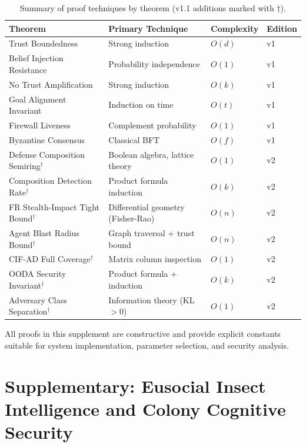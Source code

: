 \documentclass[
]{article}
\begin{document}
\begin{table}[htbp]
\centering
\caption{Summary of proof techniques by theorem (v1.1 additions marked with $\dagger$).}
\label{tab:proof-summary-v2}
\begin{tabular}{@{}llll@{}}
\toprule
Theorem & Primary Technique & Complexity & Edition \\
\midrule
Trust Boundedness & Strong induction & $O(d)$ & v1 \\
Belief Injection Resistance & Probability independence & $O(1)$ & v1 \\
No Trust Amplification & Strong induction & $O(k)$ & v1 \\
Goal Alignment Invariant & Induction on time & $O(t)$ & v1 \\
Firewall Liveness & Complement probability & $O(1)$ & v1 \\
Byzantine Consensus & Classical BFT & $O(f)$ & v1 \\
Defense Composition Semiring$^\dagger$ & Boolean algebra, lattice theory & $O(1)$ & v2 \\
Composition Detection Rate$^\dagger$ & Product formula induction & $O(k)$ & v2 \\
FR Stealth-Impact Tight Bound$^\dagger$ & Differential geometry (Fisher-Rao) & $O(n)$ & v2 \\
Agent Blast Radius Bound$^\dagger$ & Graph traversal + trust bound & $O(n)$ & v2 \\
CIF-AD Full Coverage$^\dagger$ & Matrix column inspection & $O(1)$ & v2 \\
OODA Security Invariant$^\dagger$ & Product formula + induction & $O(k)$ & v2 \\
Adversary Class Separation$^\dagger$ & Information theory (KL $> 0$) & $O(1)$ & v2 \\
\bottomrule
\end{tabular}
\end{table}

All proofs in this supplement are constructive and provide explicit
constants suitable for system implementation, parameter selection, and
security analysis.

\newpage

\newpage

\section{Supplementary: Eusocial Insect Intelligence and Colony
Cognitive Security}\label{sec:eusocial-cogsec}
\end{document}

